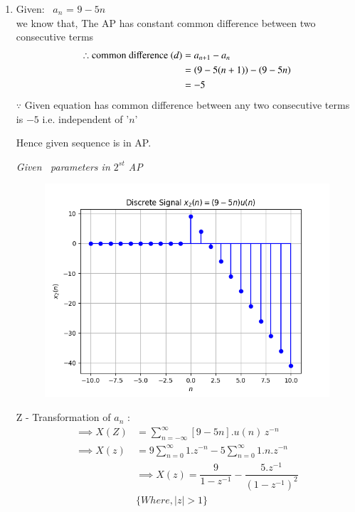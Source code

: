 \documentclass[journal,12pt,twocolumn]{IEEEtran}
\theoremstyle{remark}
\begin{document}
\begin{enumerate} [label=(\roman*)]
    \item Given: $\,$ $a_n$ = $9 - 5n$ \\
    we know that, The AP has constant common difference between two consecutive terms
    \begin{align}
        \therefore \text{common difference } (d) &= a_{n+1} - a_n \\
        &= \left(9-5(n+1)\right) - \left(9-5n\right) \nonumber\\
        &= -5
    \end{align}
   $\because$ Given equation has common difference between any two consecutive terms is $-5$ i.e. independent of '$n$'
   \begin{center}
       Hence given sequence is in AP.
   \end{center}

    \begin{table}[htbp] 
    \centering
    
    \vspace{0.2cm}
    \caption{\normalsize\textsl{Given \, parameters in $2^{st}$ AP}}
    \label{given parameters list}
    \end{table}

    \begin{figure}[!h] 
    \centering
    \includegraphics[width=\columnwidth]{figs/signal_x2.png}
    \caption{}
    \label{fig:Graph2}
    \end{figure}
     Z - Transformation of $a_n$ :
    \begin{align}
        \implies  X(Z) &= \sum_{n = -\infty}^{\infty}[9 - 5n].u(n) \, z^{-n} \\
        \implies X(z) &= 9 \sum_{n = 0}^{\infty} 1.z^{-n} - 5 \sum_{n = 0}^{\infty} 1.n.z^{-n}\\
        &\implies X(z) = \dfrac{9}{1-z^{-1}} - \dfrac{5.z^{-1}}{(1-z^{-1})^2}\\
        &\{ Where, |z|>1\} \nonumber
    \end{align}

\end{enumerate}
\end{document}

